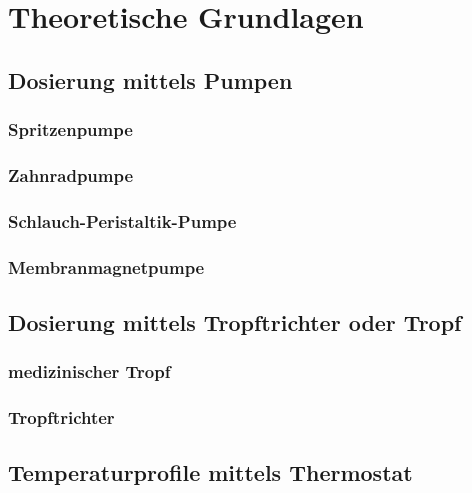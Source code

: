 \section{Theoretische Grundlagen}
\label{sec:physik}

\subsection{Dosierung mittels Pumpen}
\subsubsection*{Spritzenpumpe}
\subsubsection*{Zahnradpumpe}
\subsubsection*{Schlauch-Peristaltik-Pumpe}
\subsubsection*{Membranmagnetpumpe}

\subsection{Dosierung mittels Tropftrichter oder Tropf}
\subsubsection{medizinischer Tropf}
\subsubsection{Tropftrichter}

\subsection{Temperaturprofile mittels Thermostat}
